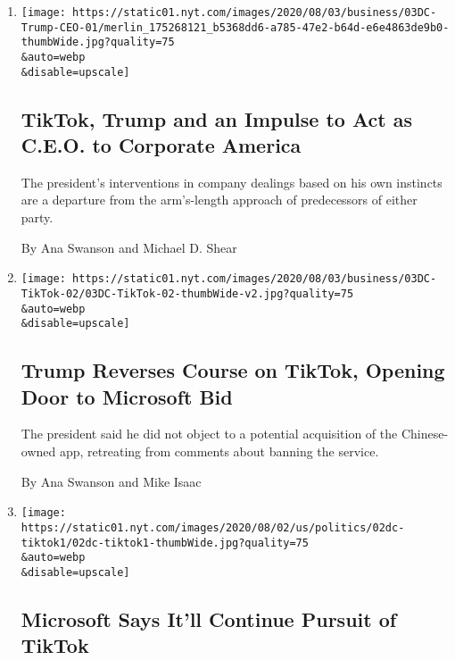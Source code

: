\begin{enumerate}
\def\labelenumi{\arabic{enumi}.}
\item
  \href{/2020/08/03/business/economy/trump-tiktok-china-business.html}{}

  \texttt{[image: https://static01.nyt.com/images/2020/08/03/business/03DC-Trump-CEO-01/merlin\_175268121\_b5368dd6-a785-47e2-b64d-e6e4863de9b0-thumbWide.jpg?quality=75\\\&auto=webp\\\&disable=upscale]}

  \hypertarget{tiktok-trump-and-an-impulse-to-act-as-ceo-to-corporate-america}{%
  \subsection{TikTok, Trump and an Impulse to Act as C.E.O. to Corporate
  America}\label{tiktok-trump-and-an-impulse-to-act-as-ceo-to-corporate-america}}

  The president's interventions in company dealings based on his own
  instincts are a departure from the arm's-length approach of
  predecessors of either party.

  By Ana Swanson and Michael D. Shear
\item
  \href{/2020/08/03/technology/trump-tiktok-microsoft.html}{}

  \texttt{[image: https://static01.nyt.com/images/2020/08/03/business/03DC-TikTok-02/03DC-TikTok-02-thumbWide-v2.jpg?quality=75\\\&auto=webp\\\&disable=upscale]}

  \hypertarget{trump-reverses-course-on-tiktok-opening-door-to-microsoft-bid}{%
  \subsection{Trump Reverses Course on TikTok, Opening Door to Microsoft
  Bid}\label{trump-reverses-course-on-tiktok-opening-door-to-microsoft-bid}}

  The president said he did not object to a potential acquisition of the
  Chinese-owned app, retreating from comments about banning the service.

  By Ana Swanson and Mike Isaac
\item
  \href{/2020/08/02/business/economy/trump-tiktok-china-national-security.html}{}

  \texttt{[image: https://static01.nyt.com/images/2020/08/02/us/politics/02dc-tiktok1/02dc-tiktok1-thumbWide.jpg?quality=75\\\&auto=webp\\\&disable=upscale]}

  \hypertarget{microsoft-says-itll-continue-pursuit-of-tiktok}{%
  \subsection{Microsoft Says It'll Continue Pursuit of
  TikTok}\label{microsoft-says-itll-continue-pursuit-of-tiktok}}


\end{enumerate}
